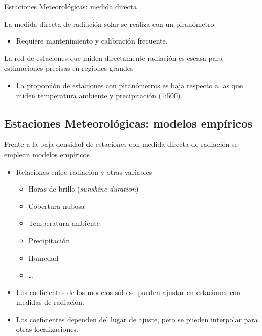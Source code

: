 \documentclass[xcolor={usenames,svgnames,dvipsnames}]{beamer}
\begin{document}
\begin{frame}[label={sec:org36faeee}]{Estaciones Meteorológicas: medida directa}
\begin{block}{La medida directa de radiación solar se realiza con un piranómetro.}
\begin{itemize}
\item Requiere mantenimiento y calibración frecuente.
\end{itemize}
\end{block}

\begin{block}{La red de estaciones que miden directamente radiación es escasa para estimaciones precisas en regiones grandes}
\begin{itemize}
\item La proporción de estaciones con piranómetros es baja respecto a
las que miden temperatura ambiente y precipitación (1:500).
\end{itemize}
\end{block}
\end{frame}

\subsection{Estaciones Meteorológicas: modelos empíricos}
\label{sec:org8e6a556}
\begin{frame}[label={sec:org7a5075c}]{Frente a la baja densidad de estaciones con medida directa de radiación se emplean modelos empíricos}
\begin{itemize}
\item Relaciones entre radiación y otras variables
\begin{itemize}
\item Horas de brillo (\emph{sunshine duration})
\item Cobertura nubosa
\item Temperatura ambiente
\item Precipitación
\item Humedad
\item \ldots{}
\end{itemize}
\item Los coeficientes de los modelos sólo se pueden ajustar en estaciones
con medidas de radiación.
\item Los coeficientes dependen del lugar de ajuste, pero se pueden
interpolar para otras localizaciones.
\end{itemize}
\end{frame}
\end{document}
